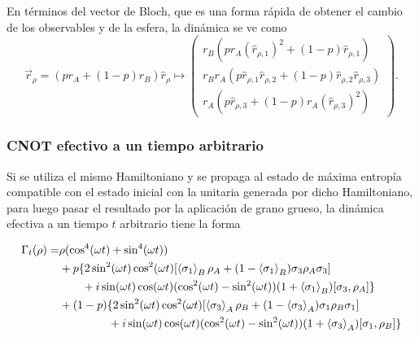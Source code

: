 En términos del vector de Bloch, que es una forma rápida de obtener el cambio de los observables y de la esfera, la dinámica se ve como
\begin{equation*}
    \vec{r}_{\rho}=(pr_{A}+(1-p)r_{B})\hat{r}_{\rho}\mapsto\begin{pmatrix}
        r_{B}(pr_{A}(\hat{r}_{\rho,1})^2+(1-p)\hat{r}_{\rho,1})\\
        r_{B}r_{A}(p\hat{r}_{\rho,1}\hat{r}_{\rho,2}+(1-p)\hat{r}_{\rho,2}\hat{r}_{\rho,3})\\
        r_{A}(p\hat{r}_{\rho,3}+(1-p)r_{A}(\hat{r}_{\rho,3})^{2})
    \end{pmatrix}.
  \end{equation*}

\subsubsection{CNOT efectivo a un tiempo arbitrario}

Si se utiliza el mismo Hamiltoniano y se propaga al estado de máxima entropía compatible con el estado inicial con la unitaria generada por dicho Hamiltoniano, para luego pasar el resultado por la aplicación de grano grueso, la dinámica efectiva a un tiempo $t$ arbitrario tiene la forma

\begin{align*}
  \Gamma_{t}(\rho)=&\rho(\cos^{4}(\omega t)+\sin^{4}(\omega t))\\
  &+p\{2\sin^{2}(\omega t)\cos^{2}(\omega
  t)\qty[\expval{\sigma_{1}}_{B}\rho_{A}+(1-\expval{\sigma_{1}}_{B})\sigma_{3}\rho_{A}\sigma_{3}]\\
  & \ \ \ \ \ \ +i\sin(\omega t)\cos(\omega t)(\cos^{2}(\omega t)-\sin^{2}(\omega t))(1+\expval{\sigma_{1}}_{B})[\sigma_{3},\rho_{A}]\}\\
  &+(1-p)\{2\sin^{2}(\omega t)\cos^{2}(\omega t)\qty[\expval{\sigma_{3}}_{A}\rho_{B}+(1-\expval{\sigma_{3}}_{A})\sigma_{1}\rho_{B}\sigma_{1}]\\
  &\ \ \ \ \ \ \ \ \ \ \ \ \ +i\sin(\omega t)\cos(\omega t)(\cos^{2}(\omega t)-\sin^{2}(\omega t))(1+\expval{\sigma_{3}}_{A})[\sigma_{1},\rho_{B}]\}
\end{align*} 